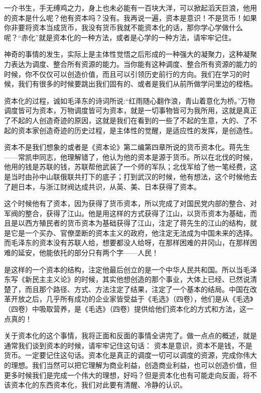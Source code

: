 \documentclass[UTF8, 12pt, a4paper]{ctexrep}
\begin{document}
一介书生，手无缚鸡之力，身上也未必能有一百块大洋，可以掀起滔天巨浪，他用的资本是什么呢？他有资本吗？没有。我再说一遍，资本是意识！不是货币！如果你非要将资本当成货币，我没有货币我就不能资本化的话，那你学心学做什么呢？“赤化”就是资本化的一种方法，或者是心学的一种方法，请牢牢记住。

神奇的事情的发生，实际上是主体性觉悟之后形成的一种强大的凝聚力，这种凝聚力表达为调度、整合所有资源的能力。当你能有这种调度、整合所有资源的能力的时候，你不仅仅可以创造价值，而且可以引领历史前行的方向。我们在学习的时候，我们有很多的时候要跳出我们固有的、或者是我们从前所做学问里边的桎梏。

资本化的过程，诚如毛泽东的诗词所说:“红雨随心翻作浪，青山着意化为桥。”万物调度皆可为资本，万物调度皆可为资本，就是一切事物皆可为我所用，这就是真正了不起的人创造奇迹的原因，这就是我们在看到的一些了不起的生意，大的、了不起的资本家创造奇迹的历史过程，是主体性的觉醒，是适应性的发挥，是创造性。

资本不是我们想象的或者是《资本论》第二编第四章所说的货币资本化。蒋先生——常凯申同志，他理解错了，他认为他的资本是源于货币。所以在北伐的时候，他用的钱是苏联的钱，苏联帮他武装了一个师的军队；北伐军给了他一笔经费，这是当时由孙中山联俄联共打下的底子；打到武汉的时候，他有想法，这个时候他去了趟日本，与浙江财阀达成共识，从英、美、日本获得了资本。

这个时候他有了资本，因为获得了货币资本，所以完成了对国民党内部的整合、对军阀的整合，获得了江山。他是用这样的方式获得了江山，以货币资本为基础，而且是以西方殖民者的货币资本为基础获得了江山，注定了蒋先生的江山的结构，就是它是一个买办、官僚垄断的资本主义的政府，他注定无法成为中国未来的选择。而毛泽东的资本没有苏联人给，想要都没人给呀，在那样困难的井冈山，在那样困难的延安，他能依托的部分只有两个字——人民！

是这样的一个资本的结构，注定他最后创立的是一个中华人民共和国。所以当毛泽东写《新民主主义论》的时候，其实他想创造的那个事业，大体上已经、已然说清楚了，而且那个路径、方式、方法注定了结果，注定了一个基本的结局。中国在改革开放之后，几乎所有成功的企业家皆受益于《毛选》（四卷），他们是从《毛选》（四卷）中吸取营养，是《毛选》（四卷）提供给他们资本化的方式和方法，这一点真的！

关于资本化的这个事情，我将正面和反面的事情全讲完了。做一点点的概述，就是通常我们谈到资本的时候，请牢牢记住这句话： 资本是意识，资本不是钱，不是货币。一定要记住这句话。资本化是真正的调度一切可以调度的资源，完成你伟大的理想。我们当然可以把它理解为商业利益，创造商业利益，也可以创造价值，但更多时候我们是完成一个伟大的理想，好吗？但是资本化也有可能走向反面，将不该资本化的东西资本化，我们对此要有清醒、冷静的认识。
\end{document}
